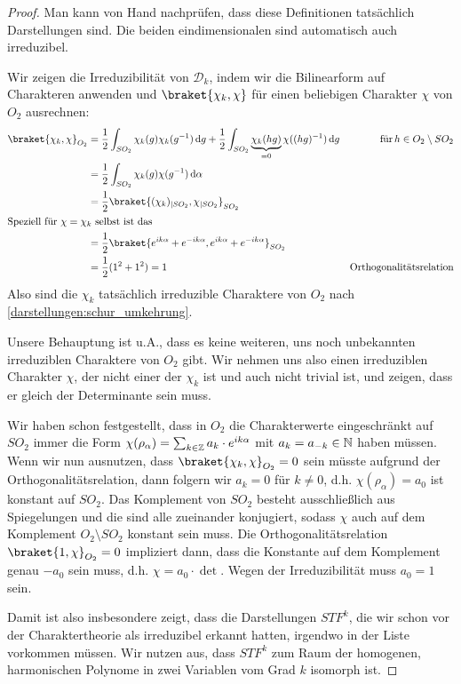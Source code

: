 \begin{proof}
Man kann von Hand nachprüfen, dass diese Definitionen tatsächlich Darstellungen sind. Die beiden eindimensionalen sind automatisch auch irreduzibel.

Wir zeigen die Irreduzibilität von $\mathcal{D}_k$, indem wir die Bilinearform auf Charakteren anwenden und $\braket{\chi_k,\chi}$ für einen beliebigen Charakter $\chi$ von $O_2$ ausrechnen:
\begin{align*}
\braket{\chi_k,\chi}_{O_2} &= \frac{1}{2}\int_{SO_2} \chi_k(g)\chi_k(g^{-1}) \dd g + \frac{1}{2}\int_{SO_2} \underbrace{\chi_k(hg)}_{=0}\chi((hg)^{-1})\dd g &\text{für}\,h\in O_2\setminus SO_2\\
&= \frac{1}{2}\int_{SO_2} \chi_k(g)\chi(g^{-1}) \dd \alpha \\
&= \frac{1}{2} \braket{ (\chi_k)_{|SO_2} , \chi_{|SO_2}}_{SO_2} \\
\intertext{Speziell für $\chi=\chi_k$ selbst ist das}
&= \frac{1}{2} \braket{e^{ik\alpha} + e^{-ik\alpha}, e^{ik\alpha} + e^{-ik\alpha}}_{SO_2} \\
&=\frac{1}{2}(1^2 + 1^2)=1 &\text{Orthogonalitätsrelation}
\end{align*}
Also sind die $\chi_k$ tatsächlich irreduzible Charaktere von $O_2$ nach \ref{darstellungen:schur_umkehrung}.

\medbreak
Unsere Behauptung ist u.A., dass es keine weiteren, uns noch unbekannten irreduziblen Charaktere von $O_2$ gibt. Wir nehmen uns also einen irreduziblen Charakter $\chi$, der nicht einer der $\chi_k$ ist und auch nicht trivial ist, und zeigen, dass er gleich der Determinante sein muss.

\smallbreak
Wir haben schon festgestellt, dass in $O_2$ die Charakterwerte eingeschränkt auf $SO_2$ immer die Form $\chi(\rho_\alpha) = \sum_{k\in\mathbb{Z}} a_k\cdot  e^{ik\alpha}$ mit $a_k=a_{-k}\in\mathbb{N}$ haben müssen. Wenn wir nun ausnutzen, dass $\braket{\chi_k,\chi}_{O_2}=0$ sein müsste aufgrund der Orthogonalitätsrelation, dann folgern wir $a_k=0$ für $k\neq 0$, d.h. $\chi(\rho_\alpha)=a_0$ ist konstant auf $SO_2$. Das Komplement von $SO_2$ besteht ausschließlich aus Spiegelungen und die sind alle zueinander konjugiert, sodass $\chi$ auch auf dem Komplement $O_2\setminus SO_2$ konstant sein muss. Die Orthogonalitätsrelation $\braket{1,\chi}_{O_2}=0$ impliziert dann, dass die Konstante auf dem Komplement genau $-a_0$ sein muss, d.h. $\chi = a_0\cdot \det$. Wegen der Irreduzibilität muss $a_0=1$ sein.

\medbreak
Damit ist also insbesondere zeigt, dass die Darstellungen $STF^k$, die wir schon vor der Charaktertheorie als irreduzibel erkannt hatten, irgendwo in der Liste vorkommen müssen. Wir nutzen aus, dass $STF^k$ zum Raum der homogenen, harmonischen Polynome in zwei Variablen vom Grad $k$ isomorph ist.


\end{proof}
